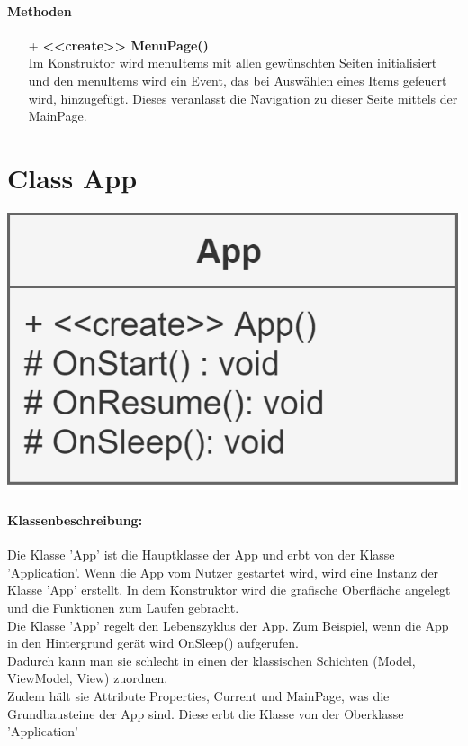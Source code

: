 \documentclass[a4paper,12pt]{article}
\begin{document}
		\paragraph{Methoden}
		\begin{itemize}
			\item [+] \textbf{<<create>> MenuPage()}\\ Im Konstruktor wird menuItems mit allen gewünschten Seiten initialisiert und den menuItems wird ein Event, das bei Auswählen eines Items gefeuert wird, hinzugefügt. Dieses veranlasst die Navigation zu dieser Seite mittels der MainPage.\\
		\end{itemize}
	
	
	\begin{minipage}[b]{0.7\textwidth}
		
		\section{Class App}
	\end{minipage}
	\begin{minipage}[c]{0.3\textwidth}
		\includegraphics{bilder/ViewKlassen/AppClass.png}
	\end{minipage}
	\paragraph{Klassenbeschreibung:}
	Die Klasse 'App' ist die Hauptklasse der App und erbt von der Klasse 'Application'. Wenn die App vom Nutzer gestartet wird, wird eine Instanz der Klasse 'App' erstellt. In dem Konstruktor wird die grafische Oberfläche angelegt und die Funktionen zum Laufen gebracht.\\
	Die Klasse 'App' regelt den Lebenszyklus der App. Zum Beispiel, wenn die App in den Hintergrund gerät wird OnSleep() aufgerufen.\\
	Dadurch kann man sie schlecht in einen der klassischen Schichten (Model, ViewModel, View) zuordnen.\\
	Zudem hält sie Attribute Properties, Current und MainPage, was die Grundbausteine der App sind. Diese erbt die Klasse von der Oberklasse 'Application'
	
\end{document}
